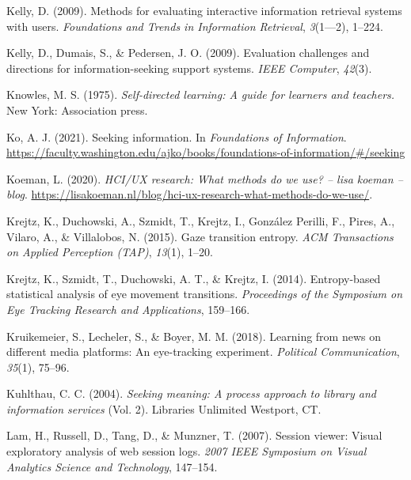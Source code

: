 \documentclass[letterpaper, nobind]{templates/ociamthesis}
\newlength{\cslhangindent}
\newenvironment{CSLReferences}[2] %
 {%
  \setlength{\parindent}{0pt}
  \ifodd #1
  \let\oldpar\par
  \def\par{\hangindent=\cslhangindent\oldpar}
  \fi
  \setlength{\parskip}{1mm}
  \setlength{\baselineskip}{6mm}
 }%
 {}
\begin{document}
\begin{CSLReferences}{1}{0}
\leavevmode{}%
Kelly, D. (2009). Methods for evaluating interactive information retrieval systems with users. \emph{Foundations and Trends in Information Retrieval}, \emph{3}(1---2), 1--224.

\leavevmode{}%
Kelly, D., Dumais, S., \& Pedersen, J. O. (2009). Evaluation challenges and directions for information-seeking support systems. \emph{IEEE Computer}, \emph{42}(3).

\leavevmode{}%
Knowles, M. S. (1975). \emph{Self-directed learning: A guide for learners and teachers.} New York: Association press.

\leavevmode{}%
Ko, A. J. (2021). Seeking information. In \emph{Foundations of {Information}}. \url{https://faculty.washington.edu/ajko/books/foundations-of-information/\#/seeking}

\leavevmode{}%
Koeman, L. (2020). \emph{HCI/UX research: What methods do we use? -- lisa koeman -- blog}. \url{https://lisakoeman.nl/blog/hci-ux-research-what-methods-do-we-use/}.

\leavevmode{}%
Krejtz, K., Duchowski, A., Szmidt, T., Krejtz, I., González Perilli, F., Pires, A., Vilaro, A., \& Villalobos, N. (2015). Gaze transition entropy. \emph{ACM Transactions on Applied Perception (TAP)}, \emph{13}(1), 1--20.

\leavevmode{}%
Krejtz, K., Szmidt, T., Duchowski, A. T., \& Krejtz, I. (2014). Entropy-based statistical analysis of eye movement transitions. \emph{Proceedings of the Symposium on Eye Tracking Research and Applications}, 159--166.

\leavevmode{}%
Kruikemeier, S., Lecheler, S., \& Boyer, M. M. (2018). Learning from news on different media platforms: An eye-tracking experiment. \emph{Political Communication}, \emph{35}(1), 75--96.

\leavevmode{}%
Kuhlthau, C. C. (2004). \emph{Seeking meaning: A process approach to library and information services} (Vol. 2). Libraries Unlimited Westport, CT.

\leavevmode{}%
Lam, H., Russell, D., Tang, D., \& Munzner, T. (2007). Session viewer: Visual exploratory analysis of web session logs. \emph{2007 IEEE Symposium on Visual Analytics Science and Technology}, 147--154.


\end{CSLReferences}
\end{document}
